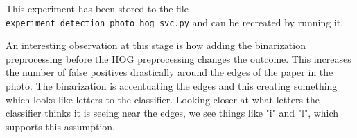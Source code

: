 This experiment has been stored to the file \texttt{experiment\_detection\_photo\_hog\_svc.py} and can be recreated by running it.

An interesting observation at this stage is how adding the binarization preprocessing before the HOG preprocessing changes the outcome.
This increases the number of false positives drastically around the edges of the paper in the photo.
The binarization is accentuating the edges and this creating something which looks like letters to the classifier.
Looking closer at what letters the classifier thinks it is seeing near the edges, we see things like "i" and "l", which supports this assumption.

